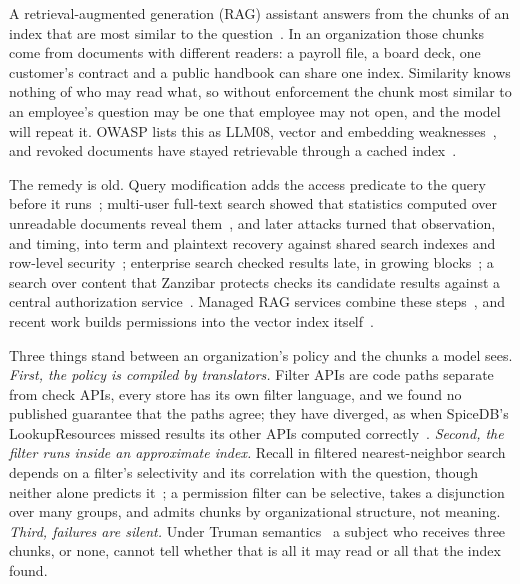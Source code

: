 
A retrieval-augmented generation (RAG) assistant answers from the chunks of an index that are most
similar to the question~\cite{lewis2020retrievalaugmented}. In an organization those chunks come
from documents with different readers: a payroll file, a board deck, one customer's contract and a
public handbook can share one index. Similarity knows nothing of who may read what, so without
enforcement the chunk most similar to an employee's question may be one that employee may not open,
and the model will repeat it. OWASP lists this as LLM08, vector and embedding
weaknesses~\cite{owasp2025llm082025}, and revoked documents have stayed retrievable through a cached
index~\cite{roychowdhury2024confusedpilot}.

The remedy is old. Query modification adds the access predicate to the query before it
runs~\cite{stonebraker1974access}; multi-user full-text search showed that statistics computed over
unreadable documents reveal them~\cite{buttcher2005security}, and later attacks turned that observation, and
timing, into term and plaintext recovery against shared search indexes and row-level
security~\cite{wang2017sidechannel,espiritu2026plaintext}; enterprise search checked results late, in
growing blocks~\cite{bailey2006secure}; a search over content that Zanzibar protects checks its candidate results
against a central authorization service~\cite{pang2019zanzibar}. Managed RAG services combine these
steps~\cite{aws2026access}, and recent work builds permissions into the vector index
itself~\cite{zhong2026honeybee,han2026dont}.

Three things stand between an organization's policy and the chunks a model sees. \emph{First, the policy is
compiled by translators.} Filter APIs are code paths separate from check APIs, every store has its own filter
language, and we found no published guarantee that the paths agree; they have diverged, as when SpiceDB's
LookupResources missed results its other APIs computed correctly~\cite{nvd2025cve202565111}. \emph{Second, the
filter runs inside an approximate index.} Recall in filtered nearest-neighbor search depends on a filter's
selectivity and its correlation with the question, though neither alone predicts
it~\cite{patel2024acorn,lim2026revisiting}; a permission filter can be selective, takes a disjunction over many
groups, and admits chunks by organizational structure, not meaning. \emph{Third, failures are
silent.} Under Truman semantics~\cite{rizvi2004extending} a subject who receives three chunks, or none,
cannot tell whether that is all it may read or all that the index found.

